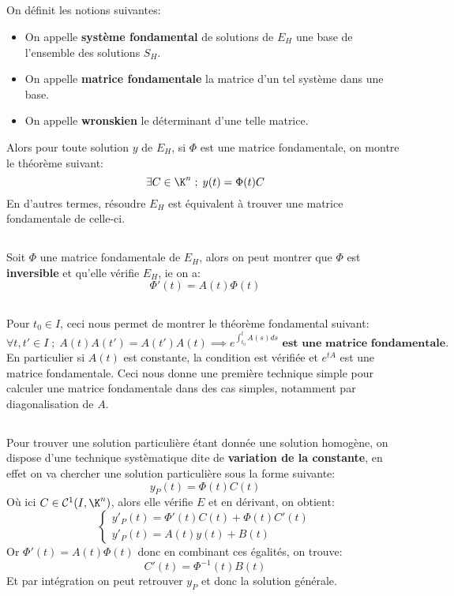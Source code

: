 \subsection*{}
On définit les notions suivantes:
\begin{itemize}
   \item On appelle \textbf{système fondamental} de solutions de \( E_H \) une base de l'ensemble des solutions \( S_H \).
   \item On appelle \textbf{matrice fondamentale} la matrice d'un tel système dans une base.
   \item On appelle \textbf{wronskien} le déterminant d'une telle matrice.
\end{itemize}
Alors pour toute solution \( y \) de \( E_H \), si \( \Phi \) est une matrice fondamentale, on montre le théorème suivant:
\[ 
   \exists C \in \K^n \; ; \; y(t) = \Phi(t)C 
\]
En d'autres termes, résoudre \( E_H \) est équivalent à trouver une matrice fondamentale de celle-ci.
\subsection*{}
Soit \( \Phi \) une matrice fondamentale de \( E_H \), alors on peut montrer que \( \Phi \) est \textbf{inversible} et qu'elle vérifie \( E_H \), ie on a:
\[ 
   \Phi'(t) = A(t)\Phi(t) 
\]
\subsection*{}
Pour \( t_0 \in I \), ceci nous permet de montrer le théorème fondamental suivant:
\[ 
   \forall t, t' \in I \; ; \; A(t)A(t') = A(t')A(t) \implies e^{ \int_{t_0}^t A(s) ds} \textbf{ est une matrice fondamentale.}
\]
En particulier si \( A(t) \) est constante, la condition est vérifiée et \( e^{tA} \) est une matrice fondamentale. Ceci nous donne une première technique simple pour calculer une matrice fondamentale dans des cas simples, notamment par diagonalisation de \( A \).
\subsection*{}
Pour trouver une solution particulière étant donnée une solution homogène, on dispose d'une technique systèmatique dite de \textbf{variation de la constante}, en effet on va chercher une solution particulière sous la forme suivante:
\[ 
   y_P(t) = \Phi(t)C(t) 
\]
Où ici \( C \in \mathcal{C}^1(I, \K^n)\), alors elle vérifie \( E \) et en dérivant, on obtient:
\[ 
   \begin{cases}
      y'_P(t) = \Phi'(t)C(t) + \Phi(t)C'(t)\\
      y'_P(t) = A(t)y(t) + B(t)
   \end{cases}
\]
Or \( \Phi'(t) = A(t)\Phi(t) \) donc en combinant ces égalités, on trouve:
\[ 
   C'(t) = \Phi^{-1}(t)B(t)
\]
Et par intégration on peut retrouver \( y_P \) et donc la solution générale.
